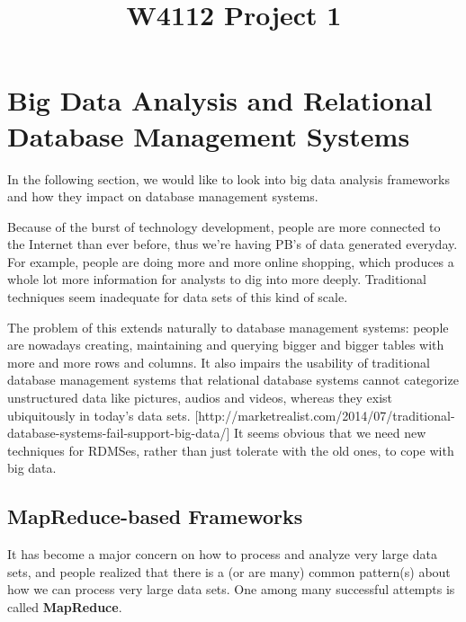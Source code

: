 \documentclass{article}
\title{W4112 Project 1}
\begin{document}
\section{Big Data Analysis and Relational Database Management Systems}

In the following section, we would like to look into big data analysis frameworks and how they impact on database management systems.

Because of the burst of technology development, people are more connected to the Internet than ever before, thus we're having PB's of data generated everyday. For example, people are doing more and more online shopping, which produces a whole lot more information for analysts to dig into more deeply. Traditional techniques seem inadequate for data sets of this kind of scale. 

The problem of this extends naturally to database management systems: people are nowadays creating, maintaining and querying bigger and bigger tables with more and more rows and columns. It also impairs the usability of traditional database management systems that relational database systems cannot categorize unstructured data like pictures, audios and videos, whereas they exist ubiquitously in today's data sets. [http://marketrealist.com/2014/07/traditional-database-systems-fail-support-big-data/] It seems obvious that we need new techniques for RDMSes, rather than just tolerate with the old ones, to cope with big data.

\subsection{MapReduce-based Frameworks}

It has become a major concern on how to process and analyze very large data sets, and people realized that there is a (or are many) common pattern(s) about how we can process very large data sets. One among many successful attempts is called \textbf{MapReduce}.
\end{document}
